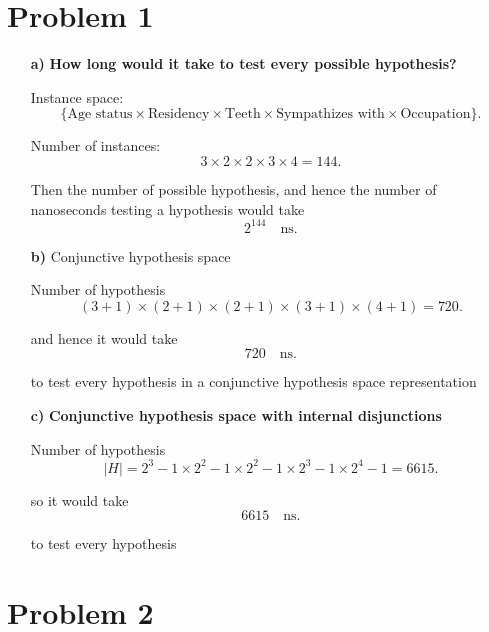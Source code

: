 
\subsectionfont{\fontsize{10}{10}\selectfont}

\graphicspath{ {/home/computer/ucsc/master-2/quarter-1/machine-learning/assignment_02/figures/} }

\section{Problem 1}%
\begin{itemize}
  \item[ \textbf{a)} ] \textbf{How long would it take to test every possible
    hypothesis?}

    Instance space: 
    \[
      \{\text{Age status} \times \text{Residency} \times \text{Teeth} \times 
      \text{Sympathizes with}\times \text{Occupation}\}
    .\] 

    Number of instances: 
    \[
    3\times 2\times 2\times 3\times 4 = 144
    .\] 

    Then the number of possible hypothesis, and hence the number of nanoseconds
    testing a hypothesis would take 
    \[
      \boxed{2^{144} \quad \text{ns} }
    .\] 

  \item[ \textbf{b)} ] Conjunctive hypothesis space

    Number of hypothesis
    \[
      (3+1)\times (2+1)\times (2+1)\times (3+1)\times (4+1) = 720
    .\] 

    and hence it would take
    \[
      \boxed{720 \quad \text{ns}}
    .\] 

    to test every hypothesis in a conjunctive hypothesis space representation

  \item[ \textbf{c)} ]  \textbf{Conjunctive hypothesis space with internal
  disjunctions}

  Number of hypothesis
  \[
    |H| = 2^3-1\times 2^2-1\times 2^2-1\times 2^3-1\times 2^4-1 = 6615
  .\] 

  so it would take 
  \[
    \boxed{6615 \quad \text{ns}}
  .\] 

  to test every hypothesis

\end{itemize}


\section{Problem 2}%

